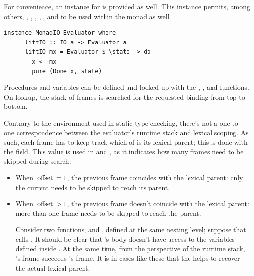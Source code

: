\documentclass[UdineBachThesis,american,11pt]{PhdThesis}
\begin{document}
  For convenience, an instance for \lstinline@MonadIO@ is provided as well. This
  instance permits, among others, \lstinline@newRef@, \lstinline@readRef@,
  \lstinline@writeRef@, \lstinline@cloneRef@, \lstinline@compareRefs@,
  \lstinline@cloneVals@ and \lstinline@compareVals@ to be used within the
  \lstinline@Evaluator@ monad as well.

  \begin{lstlisting}[gobble=4,basicstyle=\ttfamily\small]
    instance MonadIO Evaluator where
      liftIO :: IO a -> Evaluator a
      liftIO mx = Evaluator $ \state -> do
        x <- mx
        pure (Done x, state)
  \end{lstlisting}

  Procedures and variables can be defined and looked up with the
  \lstinline@defineFun@, \lstinline@lookupFun@, \lstinline@defineVar@ and
  \lstinline@lookupVar@ functions. On lookup, the stack of frames is searched
  for the requested binding from top to bottom.

  Contrary to the environment used in static type checking, there's not a
  one-to-one correspondence between the evaluator's runtime stack and lexical
  scoping. As such, each frame has to keep track which of is its lexical parent;
  this is done with the \lstinline@offset@ field. This value is used in
  \lstinline@lookupFun@ and \lstinline@lookupVar@, as it indicates how many
  frames need to be skipped during search:

  \begin{itemize}
    \item When $\text{\lstinline@offset@} = 1$, the previous frame coincides
    with the lexical parent: only the current needs to be skipped to reach its
    parent.

    \item When $\text{\lstinline@offset@} > 1$, the previous frame doesn't
    coincide with the lexical parent: more than one frame needs to be skipped to
    reach the parent.

    Consider two functions, \lstinline@f@ and \lstinline@g@, defined at the same
    nesting level; suppose that \lstinline@f@ calls \lstinline@g@. It should be
    clear that \lstinline@g@'s body doesn't have access to the variables defined
    inside \lstinline@f@. At the same time, from the perspective of the runtime
    stack, \lstinline@g@'s frame succeeds \lstinline@f@'s frame. It is in cases
    like these that the \lstinline@offset@ helps to recover the actual lexical
    parent.
  \end{itemize}
\end{document}
